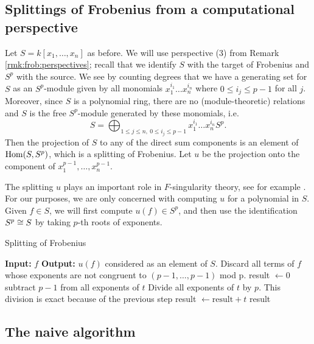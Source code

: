 \subsection{Splittings of Frobenius from a computational perspective}

Let \(S = k[x_{1}, \ldots, x_{n}]\) as before. 
We will use perspective (3) from
Remark \ref{rmk:frob:perspectives}; 
recall that we identify 
\(S\) with the target of Frobenius and
\(S^{p}\) with the source.
We see 
by counting degrees
that we have a generating set for \(S\) as an
\(S^{p}\)-module given by
all monomials
\(x_{1}^{i_{1}}\ldots x_{n}^{i_{n}}\)
where \(0 \leq i_{j} \leq p-1\) for all \(j\).
Moreover, since \(S\) is a polynomial ring, 
there are no (module-theoretic) relations
and
\(S\) is the free \(S^{p}\)-module generated by 
these monomials, i.e.  \[
S = \bigoplus_{1 \leq j \leq n,~ 0 \leq i_{j} \leq p-1}^{} x_{1}^{i_{1}}\ldots x_{n}^{i_{n}} S^{p}
.\] 
Then the projection of \(S\) to any of the direct sum components
is an element of \(\operatorname{Hom}(S,S^{p})\), which is a
splitting of Frobenius.
Let \(u\) be the projection onto the component of
\(x_{1}^{p-1}, \ldots, x_{n}^{p-1}\).

The splitting \(u\) plays an important role in \(F\)-singularity
theory, see for example 
\cite[Claim~2.6]{ma-polstra-2021-F-sing-comm-alg}.
For our purposes, we are only concerned with computing \(u\) 
for a polynomial in \(S\). 
Given \(f \in S\), we will first compute
\(u(f) \in S^{p}\), and then use the identification
\(S^{p} \cong S\) by taking \(p\)-th roots of 
exponents.

\begin{algorithm}[H]
\caption{Splitting of Frobenius}
\label{alg:naive:u}
\begin{algorithmic}[1]
\State \textbf{Input:} \(f\) 
\State \textbf{Output:} \(u(f)\) considered as an element of \(S\).
\State Discard all terms of \(f\) whose exponents are not congruent to
	\((p-1, \ldots, p-1)\) mod p.
\State result \(\gets 0\)	
    \State subtract \(p-1\) from all exponents of \(t\)
    \State Divide all exponents of \(t\) by \(p\).
    \Comment This division is exact because of the previous step
    \State result \(\gets \text{result} + t\)
\EndFor 
\State \Return result
\end{algorithmic}
\end{algorithm}


\subsection{The naive algorithm}

